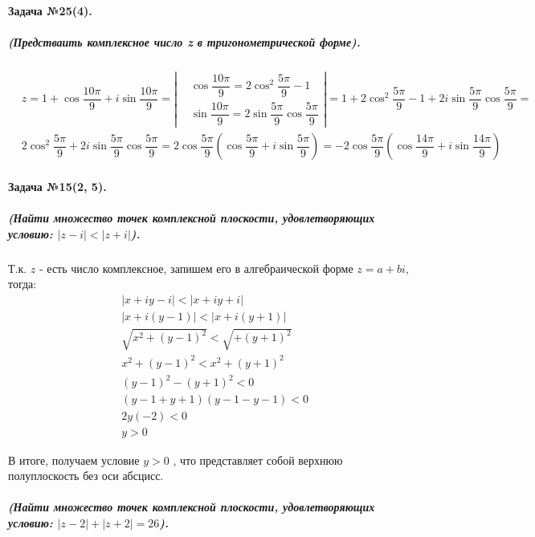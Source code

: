 \documentclass[a4paper,12pt]{report}
\begin{document}
\paragraph{Задача №25(4).}
\subparagraph{(Предстваить комплексное число z в тригонометрической форме).}

\begin{align*}
	&z=1+\cos{\dfrac{10\pi}{9}}+i\sin{\dfrac{10\pi}{9}}=
	\left|
		\begin{aligned}
			&\cos{\dfrac{10\pi}{9}}=2\cos^2{\dfrac{5\pi}{9}}-1\\
			&\sin{\dfrac{10\pi}{9}}=
			2\sin{\dfrac{5\pi}{9}}\cos{\dfrac{5\pi}{9}}
		\end{aligned}
	\right|=
	1+2\cos^2{\dfrac{5\pi}{9}}-1+
	2i\sin{\dfrac{5\pi}{9}}\cos{\dfrac{5\pi}{9}}=\\
	&2\cos^2{\dfrac{5\pi}{9}}+
	2i\sin{\dfrac{5\pi}{9}}\cos{\dfrac{5\pi}{9}}=
	2\cos{\dfrac{5\pi}{9}}
	\left(
		\cos{\dfrac{5\pi}{9}}+i\sin{\dfrac{5\pi}{9}}
	\right)=
	-2\cos{\dfrac{5\pi}{9}}
	\left(
	\cos{\dfrac{14\pi}{9}}+i\sin{\dfrac{14\pi}{9}}
	\right)
\end{align*}
 
\paragraph{Задача №15(2, 5).}
\subparagraph{(Найти множество точек комплексной плоскости, 
	удовлетворяющих условию: $ |z-i|<|z+i| $).\\} 
Т.к. $ z $ - есть число комплексное, запишем его в алгебраической форме
$ z=a+bi $, тогда:
\begin{align*}
	&|x+iy-i|<|x+iy+i|\\
	&|x+i(y-1)|<|x+i(y+1)|\\
	&\sqrt{x^2+(y-1)^2}<\sqrt{+(y+1)^2}\\
	&x^2+(y-1)^2<x^2+(y+1)^2\\
	&(y-1)^2-(y+1)^2<0\\
	&(y-1+y+1)(y-1-y-1)<0\\
	&2y(-2)<0\\
	&y>0	
\end{align*}

В итоге, получаем условие $ y>0 $ , что представляет собой верхнюю
полуплоскость без оси абсцисс.

\subparagraph{(Найти множество точек комплексной плоскости, 
	удовлетворяющих условию: $ |z-2|+|z+2|=26 $).\\\\}
\end{document}
